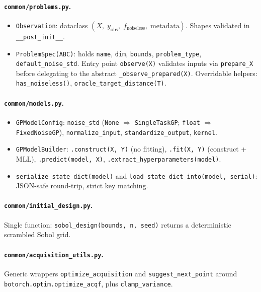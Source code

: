 \documentclass[11pt]{article}
\begin{document}
\paragraph{\texttt{common/problems.py}.}
\begin{itemize}
  \item \texttt{Observation}: dataclass $(X,\;y_{\mathrm{obs}},\;f_{\mathrm{noiseless}},\;
        \mathrm{metadata})$. Shapes validated in \texttt{\_\_post\_init\_\_}.
  \item \texttt{ProblemSpec(ABC)}: holds \texttt{name}, \texttt{dim}, \texttt{bounds},
        \texttt{problem\_type}, \texttt{default\_noise\_std}.
        Entry point \texttt{observe(X)} validates inputs via \texttt{prepare\_X} before
        delegating to the abstract \texttt{\_observe\_prepared(X)}.
        Overridable helpers: \texttt{has\_noiseless()},
        \texttt{oracle\_target\_distance(T)}.
\end{itemize}
 
\paragraph{\texttt{common/models.py}.}
\begin{itemize}
  \item \texttt{GPModelConfig}: \texttt{noise\_std} (\texttt{None} $\Rightarrow$
        \texttt{SingleTaskGP}; \texttt{float} $\Rightarrow$ \texttt{FixedNoiseGP}),
        \texttt{normalize\_input}, \texttt{standardize\_output}, \texttt{kernel}.
  \item \texttt{GPModelBuilder}: \texttt{.construct(X, Y)} (no fitting),
        \texttt{.fit(X, Y)} (construct + MLL), \texttt{.predict(model, X)},
        \texttt{.extract\_hyperparameters(model)}.
  \item \texttt{serialize\_state\_dict(model)} and
        \texttt{load\_state\_dict\_into(model, serial)}: JSON-safe round-trip,
        strict key matching.
\end{itemize}
 
\paragraph{\texttt{common/initial\_design.py}.}
Single function: \texttt{sobol\_design(bounds, n, seed)} returns a deterministic
scrambled Sobol grid.
 
\paragraph{\texttt{common/acquisition\_utils.py}.}
Generic wrappers \texttt{optimize\_acquisition} and \texttt{suggest\_next\_point}
around \texttt{botorch.optim.optimize\_acqf}, plus \texttt{clamp\_variance}.
 
\end{document}
